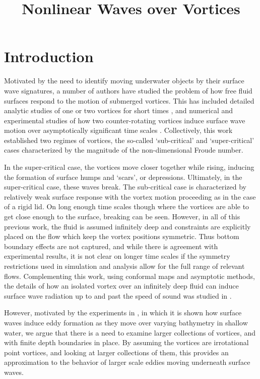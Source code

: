 \documentclass[a4paper,11pt]{article}
\title{Nonlinear Waves over Vortices}
\date{}
\begin{document}
\maketitle
\section*{Introduction}
Motivated by the need to identify moving underwater objects by their surface wave signatures, a number of authors have studied the problem of how free fluid surfaces respond to the motion of submerged vortices.  This has included detailed analytic studies of one or two vortices for short times \cite{tyvand1,tyvand2}, and numerical and experimental studies of how two counter-rotating vortices induce surface wave motion over asymptotically significant time scales \cite{marcus,tryggvason}.  Collectively, this work established two regimes of vortices, the so-called `sub-critical' and `super-critical' cases characterized by the magnitude of the non-dimensional Froude number.  

In the super-critical case, the vortices move closer together while rising, inducing the formation of surface humps and `scars', or depressions.  Ultimately, in the super-critical case, these waves break.  The sub-critical case is characterized by relatively weak surface response with the vortex motion proceeding as in the case of a rigid lid.  On long enough time scales though where the vortices are able to get close enough to the surface, breaking can be seen.  However, in all of this previous work, the fluid is assumed infinitely deep and constraints are explicitly placed on the flow which keep the vortex positions symmetric.  Thus bottom boundary effects are not captured, and while there is agreement with experimental results, it is not clear on longer time scales if the symmetry restrictions used in simulation and analysis allow for the full range of relevant flows.  Complementing this work, using conformal maps and asymptotic methods, the details of how an isolated vortex over an infinitely deep fluid can induce surface wave radiation up to and past the speed of sound was studied in \cite{ruban}.       

However, motivated by the experiments in \cite{lin,liu1,liu2}, in which it is shown how surface waves induce eddy formation as they move over varying bathymetry in shallow water, we argue that there is a need to examine larger collections of vortices, and with finite depth boundaries in place.  By assuming the vortices are irrotational point vortices, and looking at larger collections of them, this provides an approximation to the behavior of larger scale eddies moving underneath surface waves.
\end{document}
